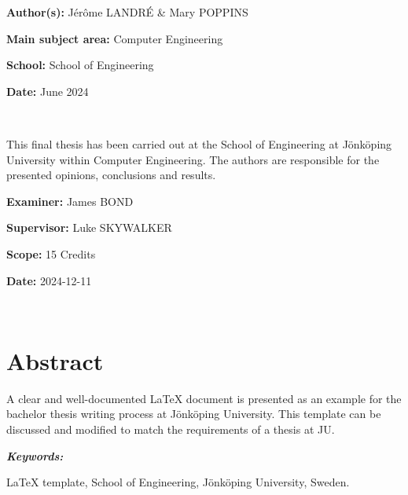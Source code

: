 \documentclass[a4paper, 12pt]{report}
\begin{document}
{
\vfill


\textbf{Author(s):} Jérôme LANDRÉ \& Mary POPPINS

\textbf{Main subject area:} Computer Engineering

\textbf{School:} School of Engineering

\textbf{Date:} June 2024

}


\newpage

{ $\;$ }

\newpage

\vspace*{20cm}

{
  \parindent=0cm 
  This final thesis has been carried out at the School of Engineering at Jönköping University within Computer Engineering. The authors are responsible for the presented opinions, conclusions and results.
  \vspace*{0.5cm}
}

{
\textbf {Examiner:} James BOND
\medskip

\textbf {Supervisor:} Luke SKYWALKER
\medskip

\textbf {Scope:} 15 Credits
\medskip

\textbf {Date:} 2024-12-11
}

\newpage

{ $\;$ }


\newpage
\tableofcontents



\newpage
\chapter*{Abstract}
{}

A clear and well-documented LaTeX document is presented as an example for the bachelor thesis writing process at Jönköping University. This template can be discussed and modified to match the requirements of a thesis at JU.

\vspace{0.6cm}
{

{\parindent=0cm\Large\textit{\textbf{Keywords:}}}

\vspace{0.3cm}
LaTeX template, School of Engineering, Jönköping University, Sweden.

}
\end{document}
